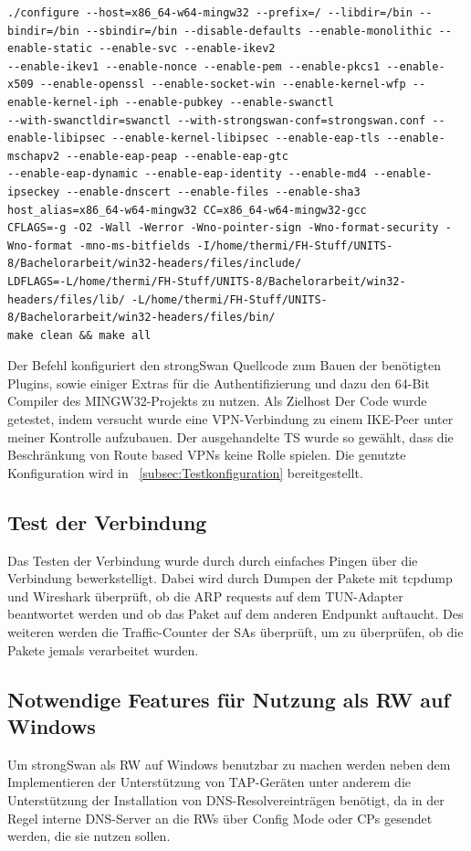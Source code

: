 \begin{lstlisting}[caption=./configure und make]
./configure --host=x86_64-w64-mingw32 --prefix=/ --libdir=/bin --bindir=/bin --sbindir=/bin --disable-defaults --enable-monolithic --enable-static --enable-svc --enable-ikev2 
--enable-ikev1 --enable-nonce --enable-pem --enable-pkcs1 --enable-x509 --enable-openssl --enable-socket-win --enable-kernel-wfp --enable-kernel-iph --enable-pubkey --enable-swanctl 
--with-swanctldir=swanctl --with-strongswan-conf=strongswan.conf --enable-libipsec --enable-kernel-libipsec --enable-eap-tls --enable-mschapv2 --enable-eap-peap --enable-eap-gtc 
--enable-eap-dynamic --enable-eap-identity --enable-md4 --enable-ipseckey --enable-dnscert --enable-files --enable-sha3 host_alias=x86_64-w64-mingw32 CC=x86_64-w64-mingw32-gcc 
CFLAGS=-g -O2 -Wall -Werror -Wno-pointer-sign -Wno-format-security -Wno-format -mno-ms-bitfields -I/home/thermi/FH-Stuff/UNITS-8/Bachelorarbeit/win32-headers/files/include/ 
LDFLAGS=-L/home/thermi/FH-Stuff/UNITS-8/Bachelorarbeit/win32-headers/files/lib/ -L/home/thermi/FH-Stuff/UNITS-8/Bachelorarbeit/win32-headers/files/bin/
make clean && make all
\end{lstlisting}
Der Befehl konfiguriert den strongSwan Quellcode zum Bauen der benötigten Plugins, sowie einiger
Extras für die Authentifizierung und dazu den 64-Bit Compiler des MINGW32-Projekts zu nutzen.
Als Zielhost
Der Code wurde getestet, indem versucht wurde eine VPN-Verbindung zu einem \ac{IKE}-Peer
unter meiner Kontrolle aufzubauen. Der ausgehandelte \ac{TS} wurde so gewählt, dass
die Beschränkung von Route based VPNs keine Rolle spielen.
Die genutzte Konfiguration wird in ~\autoref{subsec:Testkonfiguration} bereitgestellt.

\subsection{Test der Verbindung}
Das Testen der Verbindung wurde durch durch einfaches Pingen über die Verbindung bewerkstelligt.
Dabei wird durch Dumpen der Pakete mit tcpdump und Wireshark überprüft, ob die
ARP requests auf dem TUN-Adapter beantwortet werden und ob das Paket auf dem
anderen Endpunkt auftaucht. Des weiteren werden die Traffic-Counter der \acp{SA} überprüft,
um zu überprüfen, ob die Pakete jemals verarbeitet wurden.

\subsection{Notwendige Features für Nutzung als RW auf Windows}
Um strongSwan als \ac{RW} auf Windows benutzbar zu machen werden neben dem Implementieren
der Unterstützung von TAP-Geräten unter anderem die Unterstützung der Installation von DNS-Resolvereinträgen
benötigt, da in der Regel interne DNS-Server an die \acp{RW} über Config Mode oder \acp{CP}
gesendet werden, die sie nutzen sollen.

